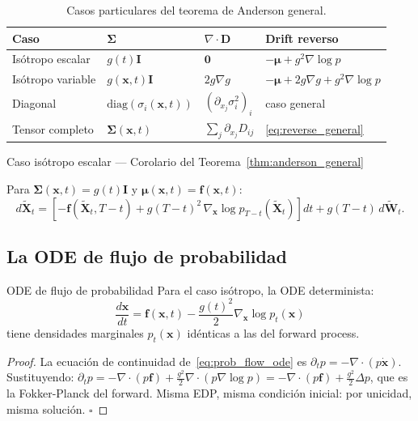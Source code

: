 \begin{table}[h]
\centering
\begin{tabular}{llll}
\toprule
\textbf{Caso} & $\bm{\Sigma}$ & $\nabla\cdot\bm{D}$ & \textbf{Drift reverso} \\
\midrule
Isótropo escalar & $g(t)\bm{I}$ & $\bm{0}$ & $-\bm{\mu}+g^2\nabla\log p$ \\
Isótropo variable & $g(\bm{x},t)\bm{I}$ & $2g\nabla g$ & $-\bm{\mu}+2g\nabla g+g^2\nabla\log p$ \\
Diagonal & $\mathrm{diag}(\sigma_i(\bm{x},t))$ & $(\partial_{x_j}\sigma_i^2)_i$ & caso general \\
Tensor completo & $\bm{\Sigma}(\bm{x},t)$ & $\sum_j\partial_{x_j}D_{ij}$ & \eqref{eq:reverse_general} \\
\bottomrule
\end{tabular}
\caption{Casos particulares del teorema de Anderson general.}
\label{tab:anderson_casos}
\end{table}

\begin{proposicion}{Caso isótropo escalar —  Corolario del Teorema~\ref{thm:anderson_general}}

\label{cor:anderson_isotropo}
Para $\bm{\Sigma}(\bm{x},t) = g(t)\bm{I}$ y $\bm{\mu}(\bm{x},t) = \bm{f}(\bm{x},t)$:
\begin{equation}
  d\tilde{\bm{X}}_t
  = \left[-\bm{f}(\tilde{\bm{X}}_t,T{-}t)
  + g(T{-}t)^2\,\nabla_{\bm{x}}\log p_{T-t}(\tilde{\bm{X}}_t)\right]dt
  + g(T{-}t)\,d\tilde{\bm{W}}_t.
  \label{eq:reverse_isotropo}
\end{equation}
\end{proposicion}

\subsection{La ODE de flujo de probabilidad}
\label{subsec:prob_flow_ode}

\begin{proposicion}{ODE de flujo de probabilidad}
\label{prop:prob_flow}
Para el caso isótropo, la ODE determinista:
\begin{equation}
  \frac{d\bm{x}}{dt}
  = \bm{f}(\bm{x},t) - \frac{g(t)^2}{2}\nabla_{\bm{x}}\log p_t(\bm{x})
  \label{eq:prob_flow_ode}
\end{equation}
tiene densidades marginales $p_t(\bm{x})$ idénticas a las del forward process.
\end{proposicion}

\begin{proof}
La ecuación de continuidad de~\eqref{eq:prob_flow_ode} es $\partial_t p =
-\nabla\cdot(p\dot{\bm{x}})$. Sustituyendo:
$\partial_t p = -\nabla\cdot(p\bm{f}) + \frac{g^2}{2}\nabla\cdot(p\nabla\log p)
= -\nabla\cdot(p\bm{f}) + \frac{g^2}{2}\Delta p$,
que es la Fokker-Planck del forward. Misma EDP, misma condición inicial: por
unicidad, misma solución. $\square$
\end{proof}

